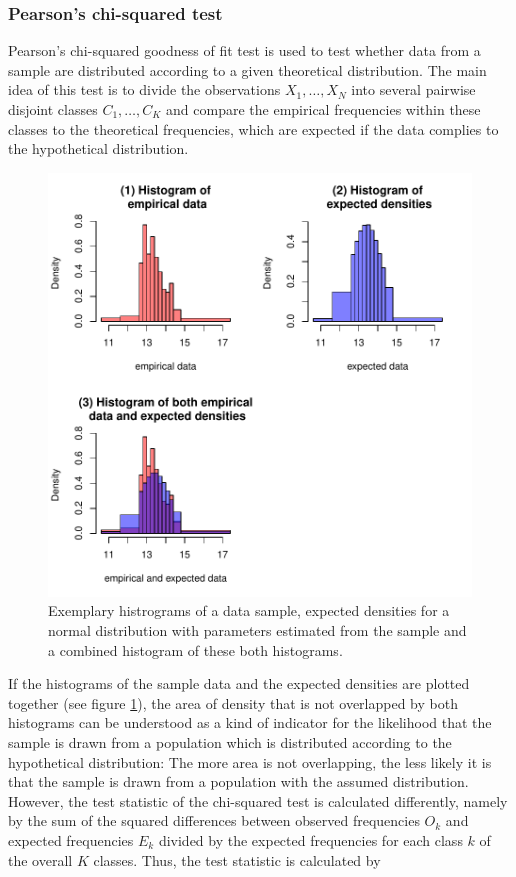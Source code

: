 \documentclass[a4paper, 12pt, titlepage, headsepline, listof = totoc, bibliography = totoc, numbers = noenddot]{scrartcl}
\begin{document}
\subsubsection{Pearson's chi-squared test}\label{sec:chisq-theoretical}
Pearson's chi-squared goodness of fit test is used to test whether data from a sample are distributed according to a given theoretical distribution. The main idea of this test is to divide the observations $X_1, \dots, X_N$ into several pairwise disjoint classes $C_1, \dots, C_K$ and compare the empirical frequencies within these classes to the theoretical frequencies, which are expected if the data complies to the hypothetical distribution.
\begin{figure}[h!]
\includegraphics[width=\textwidth]{report-chisqSampleHist}
\caption{Exemplary histrograms of a data sample, expected densities for a normal distribution with parameters estimated from the sample and a combined histogram of these both histograms.}
\label{fig:chisqSampleHist}
\end{figure}
If the histograms of the sample data and the expected densities are plotted together (see figure \ref{fig:chisqSampleHist}), the area of density that is not overlapped by both histograms can be understood as a kind of indicator for the likelihood that the sample is drawn from a population which is distributed according to the hypothetical distribution: The more area is not overlapping, the less likely it is that the sample is drawn from a population with the assumed distribution. However, the test statistic of the chi-squared test is calculated differently, namely by the sum of the squared differences between observed frequencies $O_k$ and expected frequencies $E_k$ divided by the expected frequencies for each class $k$ of the overall $K$ classes. Thus, the test statistic is calculated by
\end{document}
